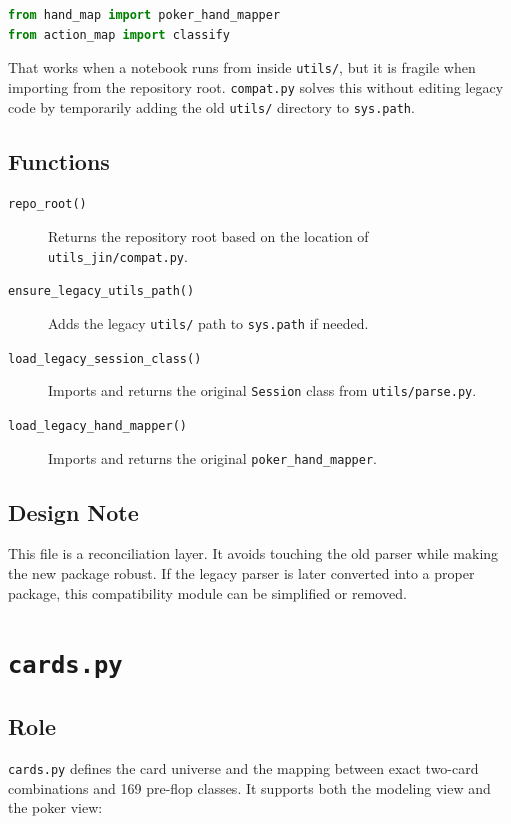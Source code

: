 \documentclass[11pt]{article}
\begin{document}
\begin{lstlisting}[language=Python]
from hand_map import poker_hand_mapper
from action_map import classify
\end{lstlisting}

That works when a notebook runs from inside \texttt{utils/}, but it is fragile
when importing from the repository root. \texttt{compat.py} solves this without
editing legacy code by temporarily adding the old \texttt{utils/} directory to
\texttt{sys.path}.

\subsection{Functions}

\begin{description}
  \item[\texttt{repo\_root()}] Returns the repository root based on the location
  of \texttt{utils\_jin/compat.py}.
  \item[\texttt{ensure\_legacy\_utils\_path()}] Adds the legacy \texttt{utils/}
  path to \texttt{sys.path} if needed.
  \item[\texttt{load\_legacy\_session\_class()}] Imports and returns the original
  \texttt{Session} class from \texttt{utils/parse.py}.
  \item[\texttt{load\_legacy\_hand\_mapper()}] Imports and returns the original
  \texttt{poker\_hand\_mapper}.
\end{description}

\subsection{Design Note}

This file is a reconciliation layer. It avoids touching the old parser while
making the new package robust. If the legacy parser is later converted into a
proper package, this compatibility module can be simplified or removed.

\section{\texttt{cards.py}}

\subsection{Role}

\texttt{cards.py} defines the card universe and the mapping between exact
two-card combinations and 169 pre-flop classes. It supports both the modeling
view and the poker view:
\end{document}
